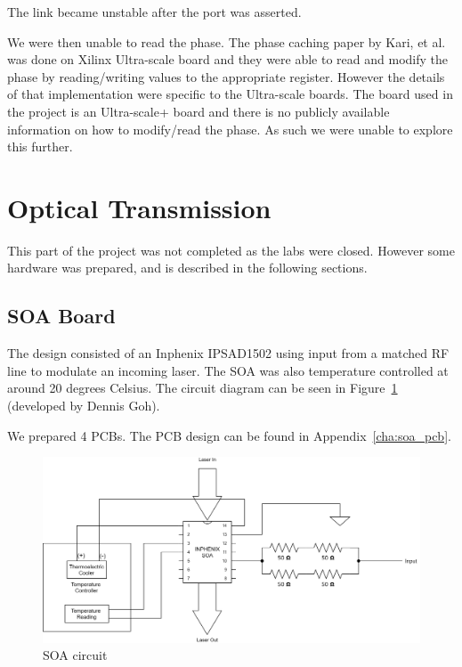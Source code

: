 The link became unstable after the port was asserted.  

We were then unable to read the phase. The phase caching paper by Kari, et al.
\cite{kari_phase} was done on Xilinx Ultra-scale board and they were able to
read and modify the phase by reading/writing values to the appropriate register.
However the details of that implementation were specific to the Ultra-scale
boards. The board used in the project is an Ultra-scale+ board and there is no
publicly available information on how to modify/read the phase. 
As such we were unable to explore this further.

\section{Optical Transmission}%
\label{optical_transmission}
This part of the project was not completed as the labs were closed. However
some hardware was prepared, and is described in the following sections.

\subsection{SOA Board}%
\label{sub:soa_board}
The design consisted of an Inphenix IPSAD1502 using input from a 
matched RF line to modulate an incoming laser. The SOA was also temperature
controlled at around 20 degrees Celsius.  The circuit diagram can be seen in
Figure~\ref{fig:soa_circuit} (developed by Dennis Goh).

We prepared 4 PCBs. The PCB design can be found in Appendix~\ref{cha:soa_pcb}.

\begin{figure}[ht]
    \centering
    \includegraphics[width=1.1\linewidth]{img/soa_circuit.png}
    \caption{SOA circuit}%
    \label{fig:soa_circuit}
\end{figure}

